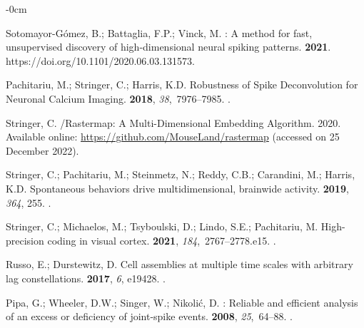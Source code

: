 \documentclass[brainsci, %
               review,accept,pdftex,moreauthors
               ]{Definitions/mdpi}
\begin{document}
\begin{adjustwidth}{-\extralength}{0cm}
\begin{thebibliography}{999}
Sotomayor-Gómez, B.; Battaglia, F.P.; Vinck, M.
: {A} method for fast, unsupervised discovery of
  high-dimensional neural spiking patterns.
 {\bf 2021}.
  {{https://doi.org/10.1101/2020.06.03.131573}}.

Pachitariu, M.; Stringer, C.; Harris, K.D.
\newblock Robustness of {Spike} {Deconvolution} for {Neuronal} {Calcium}
  {Imaging}.
 {\bf 2018}, {\em 38},~7976--7985.
.

Stringer, C.
/Rastermap: {A} Multi-Dimensional Embedding Algorithm.
  {2020}. %
  Available online: {\url{https://github.com/MouseLand/rastermap}}  {(accessed on 25 December 2022).} %


Stringer, C.; Pachitariu, M.; Steinmetz, N.; Reddy, C.B.; Carandini, M.;
  Harris, K.D.
\newblock Spontaneous behaviors drive multidimensional, brainwide activity.
 {\bf 2019}, {\em 364}, 255.
.

Stringer, C.; Michaelos, M.; Tsyboulski, D.; Lindo, S.E.; Pachitariu, M.
\newblock High-precision coding in visual cortex.
 {\bf 2021}, {\em 184},~2767--2778.e15.
.

Russo, E.; Durstewitz, D.
\newblock Cell assemblies at multiple time scales with arbitrary lag
  constellations.
 {\bf 2017}, {\em 6}, e19428.
.

Pipa, G.; Wheeler, D.W.; Singer, W.; Nikolić, D.
: Reliable and efficient analysis of an excess or
  deficiency of joint-spike events.
 {\bf 2008}, {\em
  25},~64--88.
.


\end{thebibliography}
\end{adjustwidth}
\end{document}
